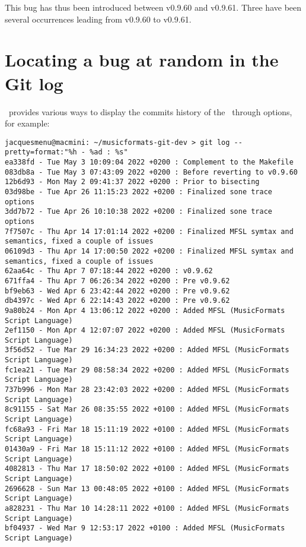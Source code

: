 This bug has thus been introduced between v0.9.60 and v0.9.61.
Three have been several  occurrences leading from v0.9.60 to v0.9.61.


\section{Locating a bug at random in the Git log}

\git\ provides various ways to display the commits history of the \repo\ through  options, for example:
\begin{lstlisting}[language=Terminal]
jacquesmenu@macmini: ~/musicformats-git-dev > git log --pretty=format:"%h - %ad : %s"
ea338fd - Tue May 3 10:09:04 2022 +0200 : Complement to the Makefile
083db8a - Tue May 3 07:43:09 2022 +0200 : Before reverting to v0.9.60
12b6d93 - Mon May 2 09:41:37 2022 +0200 : Prior to bisecting
03d98be - Tue Apr 26 11:15:23 2022 +0200 : Finalized sone trace options
3dd7b72 - Tue Apr 26 10:10:38 2022 +0200 : Finalized sone trace options
7f7507c - Thu Apr 14 17:01:14 2022 +0200 : Finalized MFSL symtax and semantics, fixed a couple of issues
06109d3 - Thu Apr 14 17:00:50 2022 +0200 : Finalized MFSL symtax and semantics, fixed a couple of issues
62aa64c - Thu Apr 7 07:18:44 2022 +0200 : v0.9.62
671ffa4 - Thu Apr 7 06:26:34 2022 +0200 : Pre v0.9.62
bf9eb63 - Wed Apr 6 23:42:44 2022 +0200 : Pre v0.9.62
db4397c - Wed Apr 6 22:14:43 2022 +0200 : Pre v0.9.62
9a80b24 - Mon Apr 4 13:06:12 2022 +0200 : Added MFSL (MusicFormats Script Language)
2ef1150 - Mon Apr 4 12:07:07 2022 +0200 : Added MFSL (MusicFormats Script Language)
3f56d52 - Tue Mar 29 16:34:23 2022 +0200 : Added MFSL (MusicFormats Script Language)
fc1ea21 - Tue Mar 29 08:58:34 2022 +0200 : Added MFSL (MusicFormats Script Language)
737b996 - Mon Mar 28 23:42:03 2022 +0200 : Added MFSL (MusicFormats Script Language)
8c91155 - Sat Mar 26 08:35:55 2022 +0100 : Added MFSL (MusicFormats Script Language)
fc68a93 - Fri Mar 18 15:11:19 2022 +0100 : Added MFSL (MusicFormats Script Language)
01430a9 - Fri Mar 18 15:11:12 2022 +0100 : Added MFSL (MusicFormats Script Language)
4082813 - Thu Mar 17 18:50:02 2022 +0100 : Added MFSL (MusicFormats Script Language)
2696628 - Sun Mar 13 00:48:05 2022 +0100 : Added MFSL (MusicFormats Script Language)
a828231 - Thu Mar 10 14:28:11 2022 +0100 : Added MFSL (MusicFormats Script Language)
bf04937 - Wed Mar 9 12:53:17 2022 +0100 : Added MFSL (MusicFormats Script Language)

\end{lstlisting}

